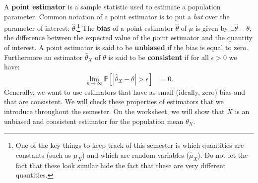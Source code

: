 \documentclass{tufte-handout}
\newcommand{\E}{\mathbb{E}}
\newcommand{\Prob}{\mathbb{P}}
\begin{document}
A \textbf{point estimator} is a sample statistic used to estimate a population
parameter. Common notation of a point estimator is to put a \textit{hat} over
the parameter of interest: $\hat{\theta}$.\footnote{
  One of the key things to keep track of this semester is which quantities are
  constants (such as $\mu_X$) and which are random variables ($\hat{\mu}_X$).
  Do not let the fact that these look similar hide the fact that these are
  very different quantities.
}
The \textbf{bias} of a point estimator $\hat{\theta}$ of $\mu$ is given by 
$\E\hat{\theta} - \theta$, the difference between the expected value of the point
estimator and the quantity of interest. A point estimator is said to be
\textbf{unbiased} if the bias is equal to zero. Furthermore an estimator
$\hat{\theta}_X$ of $\theta$ is said to be \textbf{consistent} if for all
$\epsilon > 0$ we have:
\begin{align*}
\lim_{n\rightarrow\infty}\Prob\left[ |\hat{\theta}_X - \theta| > \epsilon \right] &= 0.
\end{align*}
Generally, we want to use estimators that have as small (ideally, zero) bias and that
are consistent. We will check these properties of estimators that we introduce throughout
the semester. On the worksheet, we will show that $\bar{X}$ is an unbiased and consistent
estimator for the population mean $\theta_X$. 
\end{document}
